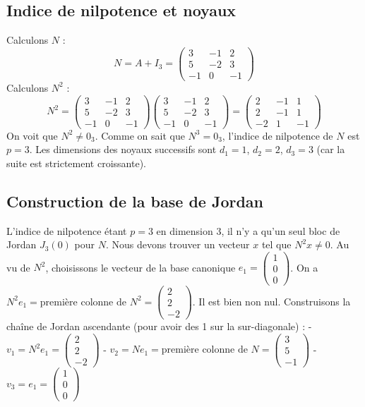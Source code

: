 \documentclass[11pt,a4paper]{article}
\begin{document}
\subsection{Indice de nilpotence et noyaux}
Calculons $N$ :
$$N = A + I_3 = \begin{pmatrix} 3 & -1 & 2 \\ 5 & -2 & 3 \\ -1 & 0 & -1 \end{pmatrix}$$
Calculons $N^2$ :
$$N^2 = \begin{pmatrix} 3 & -1 & 2 \\ 5 & -2 & 3 \\ -1 & 0 & -1 \end{pmatrix} \begin{pmatrix} 3 & -1 & 2 \\ 5 & -2 & 3 \\ -1 & 0 & -1 \end{pmatrix} = \begin{pmatrix} 2 & -1 & 1 \\ 2 & -1 & 1 \\ -2 & 1 & -1 \end{pmatrix}$$
On voit que $N^2 \neq 0_3$. Comme on sait que $N^3 = 0_3$, l'indice de nilpotence de $N$ est $p=3$.
Les dimensions des noyaux successifs sont $d_1 = 1$, $d_2 = 2$, $d_3 = 3$ (car la suite est strictement croissante).

\subsection{Construction de la base de Jordan}
L'indice de nilpotence étant $p=3$ en dimension 3, il n'y a qu'un seul bloc de Jordan $J_3(0)$ pour $N$.
Nous devons trouver un vecteur $x$ tel que $N^2 x \neq 0$.
Au vu de $N^2$, choisissons le vecteur de la base canonique $e_1 = \begin{pmatrix} 1 \\ 0 \\ 0 \end{pmatrix}$.
On a $N^2 e_1 = \text{première colonne de } N^2 = \begin{pmatrix} 2 \\ 2 \\ -2 \end{pmatrix}$. Il est bien non nul.
Construisons la chaîne de Jordan ascendante (pour avoir des 1 sur la sur-diagonale) :
- $v_1 = N^2 e_1 = \begin{pmatrix} 2 \\ 2 \\ -2 \end{pmatrix}$
- $v_2 = N e_1 = \text{première colonne de } N = \begin{pmatrix} 3 \\ 5 \\ -1 \end{pmatrix}$
- $v_3 = e_1 = \begin{pmatrix} 1 \\ 0 \\ 0 \end{pmatrix}$
\end{document}
